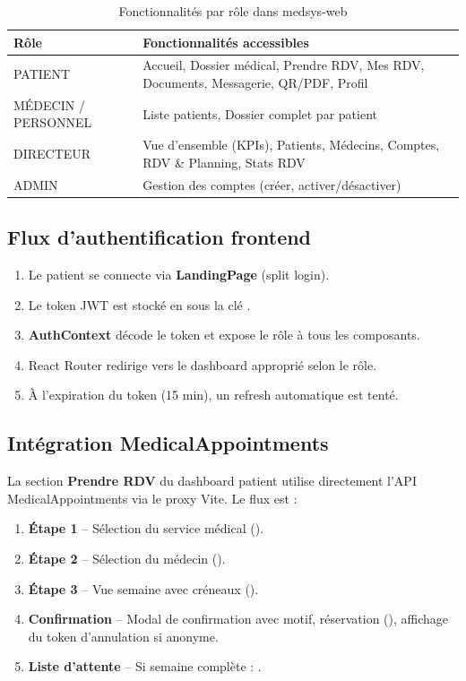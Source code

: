 \begin{table}[H]
\centering
\renewcommand{\arraystretch}{1.3}
\begin{tabular}{|l|l|}
\hline
\rowcolor{tabhead}\color{white}\textbf{Rôle} &
\color{white}\textbf{Fonctionnalités accessibles} \\
\hline
PATIENT & Accueil, Dossier médical, Prendre RDV, Mes RDV,
  Documents, Messagerie, QR/PDF, Profil \\
\rowcolor{roweven}
MÉDECIN / PERSONNEL & Liste patients, Dossier complet par patient \\
DIRECTEUR & Vue d'ensemble (KPIs), Patients, Médecins,
  Comptes, RDV \& Planning, Stats RDV \\
\rowcolor{roweven}
ADMIN & Gestion des comptes (créer, activer/désactiver) \\
\hline
\end{tabular}
\caption{Fonctionnalités par rôle dans medsys-web}
\end{table}

\subsection{Flux d'authentification frontend}

\begin{enumerate}[itemsep=3pt]
  \item Le patient se connecte via \textbf{LandingPage} (split login).
  \item Le token JWT est stocké en  sous la clé .
  \item \textbf{AuthContext} décode le token et expose le rôle à tous les composants.
  \item React Router redirige vers le dashboard approprié selon le rôle.
  \item À l'expiration du token (15 min), un refresh automatique est tenté.
\end{enumerate}

\subsection{Intégration MedicalAppointments}
La section \textbf{Prendre RDV} du dashboard patient utilise directement
l'API MedicalAppointments via le proxy Vite. Le flux est :

\begin{enumerate}[itemsep=3pt]
  \item \textbf{Étape 1} -- Sélection du service médical ().
  \item \textbf{Étape 2} -- Sélection du médecin ().
  \item \textbf{Étape 3} -- Vue semaine avec créneaux ().
  \item \textbf{Confirmation} -- Modal de confirmation avec motif, réservation
    (), affichage du token d'annulation si anonyme.
  \item \textbf{Liste d'attente} -- Si semaine complète : .
\end{enumerate}
